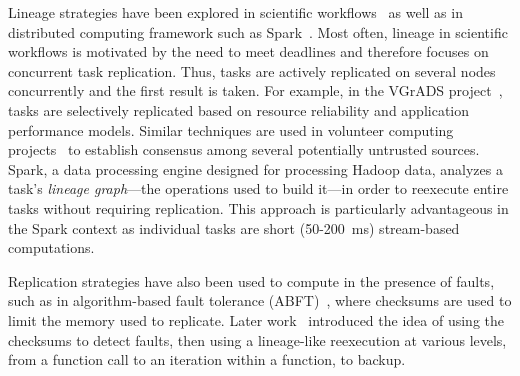 \documentclass{sig-alternate}
\begin{document}
Lineage strategies have been explored in scientific workflows~\cite{ramakrishnan09vgrads, calheiros13deadlines, Chimera2002} as well as in distributed computing framework such as Spark~\cite{RDD2012}. Most often, lineage in scientific workflows is motivated by the need to meet deadlines and therefore focuses on concurrent task replication. Thus, tasks are actively replicated on several nodes concurrently and the first result is taken. For example, in the VGrADS project~\cite{ramakrishnan09vgrads}, tasks are selectively replicated based on resource reliability and application performance models. Similar techniques are used in volunteer computing projects~\cite{boinc04} to establish consensus among several potentially untrusted sources. Spark, a data processing engine designed for processing Hadoop data, analyzes a task's \emph{lineage graph}---the operations used to build it---in order to reexecute entire tasks without requiring replication. This approach is particularly advantageous in the Spark context as individual tasks are short (50-200~ms) stream-based computations.

Replication strategies have also been used to compute in the presence of faults, such as in algorithm-based fault tolerance (ABFT)~\cite{abft}, where checksums are used to limit the memory used to replicate.  Later work~\cite{turmon1, turmon2, gunnels} introduced the idea of using the checksums to detect faults, then using a lineage-like reexecution at various levels, from a function call to an iteration within a function, to backup.
\end{document}
